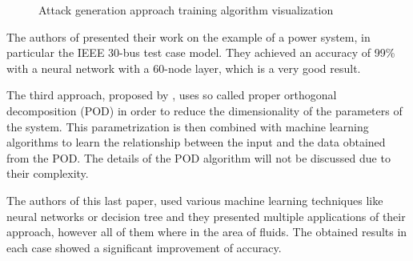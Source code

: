 \begin{figure}[H]
    \centering
    \caption{Attack generation approach training algorithm visualization} \label{fig:vis_feat2}
\end{figure}

The authors of \cite{ferragut_real-time_2017} presented their work on the example of a power system, in particular the IEEE 30-bus test case model. They achieved an accuracy of 99\% with a neural network with a 60-node layer, which is a very good result. 

The third approach, proposed by \cite{swischuk_projection-based_2019}, uses so called proper orthogonal decomposition (POD) in order to reduce the dimensionality of the parameters of the system.  This parametrization is then combined with machine learning algorithms to learn the relationship between the input and the data obtained from the POD. The details of the POD algorithm will not be discussed due to their complexity.

The authors of this last paper, used various machine learning techniques like neural networks or decision tree and they presented multiple applications of their approach, however all of them where in the area of fluids. The obtained results in each case showed a significant improvement of accuracy.

